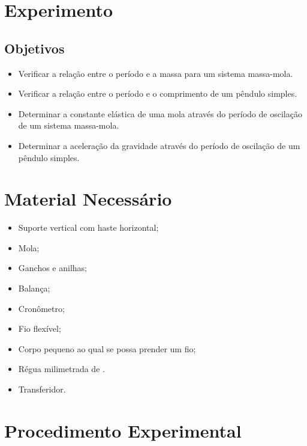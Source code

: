 \section{Experimento}

\subsection{Objetivos}
\label{Sec:ObjetivosOscilacoes}

\begin{itemize}
	\item Verificar a relação entre o período e a massa para um sistema massa-mola.
	\item Verificar a relação entre o período e o comprimento de um pêndulo simples.
	\item Determinar a constante elástica de uma mola através do período de oscilação de um sistema massa-mola.
	\item Determinar a aceleração da gravidade através do período de oscilação de um pêndulo simples.
\end{itemize}

\section{Material Necessário}
\begin{itemize}
	\item Suporte vertical com haste horizontal;
	\item Mola;
	\item Ganchos e anilhas;
	\item Balança;
	\item Cronômetro;
	\item Fio flexível;
	\item Corpo pequeno ao qual se possa prender um fio;
	\item Régua milimetrada de .
	\item Transferidor.
\end{itemize}

\section{Procedimento Experimental}

